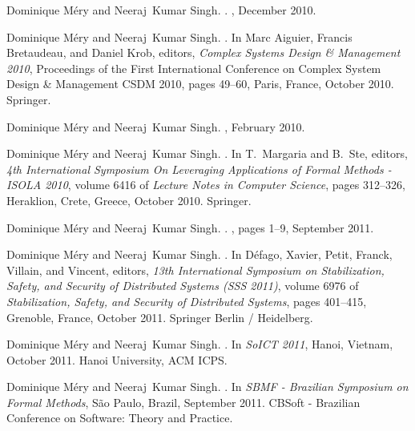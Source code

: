 \documentclass[ 12pt]{article}
\begin{document}
\begin{thebibliography}{100}
Dominique M{\'e}ry and Neeraj~Kumar Singh.
.
, December 2010.

Dominique M{\'e}ry and Neeraj~Kumar Singh.
.
\newblock In Marc Aiguier, Francis Bretaudeau, and Daniel Krob, editors, {\em
  {Complex Systems Design \& Management 2010}}, Proceedings of the First
  International Conference on Complex System Design \& Management CSDM 2010,
  pages 49--60, Paris, France, October 2010. {Springer}.

Dominique M{\'e}ry and Neeraj~Kumar Singh.
, February 2010.

Dominique M{\'e}ry and Neeraj~Kumar Singh.
.
\newblock In T.~Margaria and B.~Ste, editors, {\em {4th International Symposium
  On Leveraging Applications of Formal Methods - ISOLA 2010}}, volume 6416 of
  {\em Lecture Notes in Computer Science}, pages 312--326, Heraklion, Crete,
  Greece, October 2010. {Springer}.

Dominique M{\'e}ry and Neeraj~Kumar Singh.
.
, pages
  1--9, September 2011.

Dominique M{\'e}ry and Neeraj~Kumar Singh.
.
\newblock In D{\'e}fago, Xavier, Petit, Franck, Villain, and Vincent, editors,
  {\em {13th International Symposium on Stabilization, Safety, and Security of
  Distributed Systems (SSS 2011)}}, volume 6976 of {\em Stabilization, Safety,
  and Security of Distributed Systems}, pages 401--415, Grenoble, France,
  October 2011. {Springer Berlin / Heidelberg}.

Dominique M{\'e}ry and Neeraj~Kumar Singh.
.
\newblock In {\em {SoICT 2011}}, Hanoi, Vietnam, October 2011. {Hanoi
  University}, {ACM ICPS}.

Dominique M{\'e}ry and Neeraj~Kumar Singh.
.
\newblock In {\em {SBMF - Brazilian Symposium on Formal Methods}}, S{\~a}o
  Paulo, Brazil, September 2011. {CBSoft - Brazilian Conference on Software:
  Theory and Practice}.


\end{thebibliography}
\end{document}
